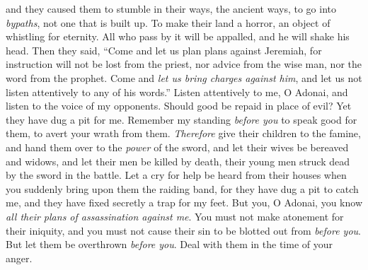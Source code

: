 \begin{biblechapter}
and they caused them to stumble in their ways, the ancient ways, 
to go into \textit{bypaths}, not one that is built up.
\verse To make their land a horror, 
an object of whistling for eternity. 
All who pass by it will be appalled, 
and he will shake his head.
 Then they said, “Come and let us plan plans against Jeremiah, for instruction will not be lost from the priest, nor advice from the wise man, nor the word from the prophet. Come and \textit{let us bring charges against him}, and let us not listen attentively to any of his words.”
\verse Listen attentively to me, O Adonai, 
and listen to the voice of my opponents.
\verse Should good be repaid in place of evil? 
Yet they have dug a pit for me. 
Remember my standing \textit{before you} to speak good for them, 
to avert your wrath from them.
\verse \textit{Therefore} give their children to the famine, 
and hand them over to the \textit{power} of the sword, 
and let their wives be bereaved and widows, 
and let their men be killed by death, 
their young men struck dead 
by the sword in the battle.
\verse Let a cry for help be heard from their houses 
when you suddenly bring upon them the raiding band, 
for they have dug a pit to catch me, 
and they have fixed secretly a trap for my feet.
\verse But you, O Adonai, you know 
\textit{all their plans of assassination against me}. 
You must not make atonement for their iniquity, 
and you must not cause their sin to be blotted out from \textit{before you}. 
But let them be overthrown \textit{before you}. 
Deal with them in the time of your anger.
\end{biblechapter}

